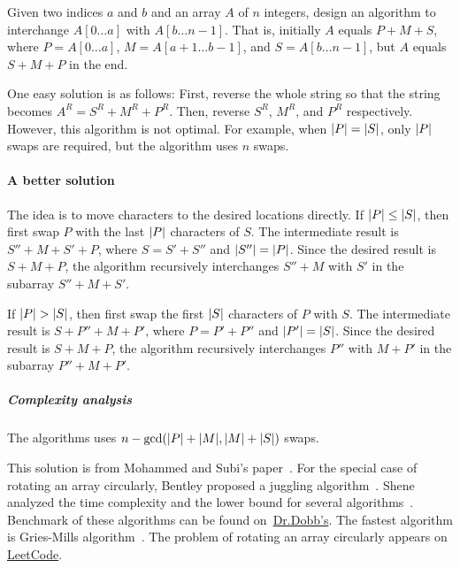 \begin{Exercise}[title=Block interchange]
Given two indices $a$ and $b$ and an array $A$ of $n$ integers, design an algorithm to interchange $A[0 \dots a]$ with $A[b \dots n - 1]$.
That is, initially $A$ equals $P + M + S$, where $P = A[0 \dots a]$, $M = A[a+1 \dots b-1]$, and $S = A[b \dots n - 1]$, but $A$ equals $S + M + P$ in the end.
\end{Exercise}
\begin{Answer}
One easy solution is as follows:
First, reverse the whole string so that the string becomes $A^R = S^R + M^R + P^R$.
Then, reverse $S^R$, $M^R$, and $P^R$ respectively.
However, this algorithm is not optimal.
For example, when $\lvert P\rvert = \lvert S\rvert$, only $\lvert P\rvert$ swaps are required, but the algorithm uses $n$ swaps.

\paragraph{A better solution}  The idea is to move characters to the desired locations directly.
If $\lvert P\rvert \leq \lvert S\rvert$, then first swap $P$ with the last $\lvert P\rvert$ characters of $S$.
The intermediate result is $S'' + M + S' + P$, where $S = S' + S''$ and $\lvert S''\rvert = \lvert P\rvert$. 
Since the desired result is $S + M + P$, the algorithm recursively interchanges $S'' + M$ with $S'$ in the subarray $S'' + M + S'$.

If $\lvert P\rvert > \lvert S\rvert$, then first swap the first $\lvert S\rvert$ characters of $P$ with $S$.
The intermediate result is $S + P'' + M + P'$, where $P = P' + P''$ and $\lvert P'\rvert = \lvert S\rvert$. 
Since the desired result is $S + M + P$, the algorithm recursively interchanges $P''$ with $M + P'$ in the subarray $P'' + M + P'$.

\subparagraph{Complexity analysis} The algorithms uses $n - \text{gcd}(\lvert P\rvert + \lvert M\rvert, \lvert M\rvert + \lvert S\rvert)$ swaps.
\begin{remark}
This solution is from Mohammed and Subi's paper~\cite{Mohammed1987}. 
For the special case of rotating an array circularly, Bentley proposed a juggling algorithm~\cite{Bentley1999}.
Shene analyzed the time complexity and the lower bound for several algorithms~\cite{Shene1997}.
Benchmark of these algorithms can be found on~\href{http://www.drdobbs.com/parallel/benchmarking-block-swapping-algorithms/232900395}{Dr.Dobb's}.
The fastest algorithm is Gries-Mills algorithm~\cite{Gries1981}.
The problem of rotating an array circularly appears on \href{https://leetcode.com/problems/rotate-array/}{LeetCode}.
\end{remark}
\end{Answer}

